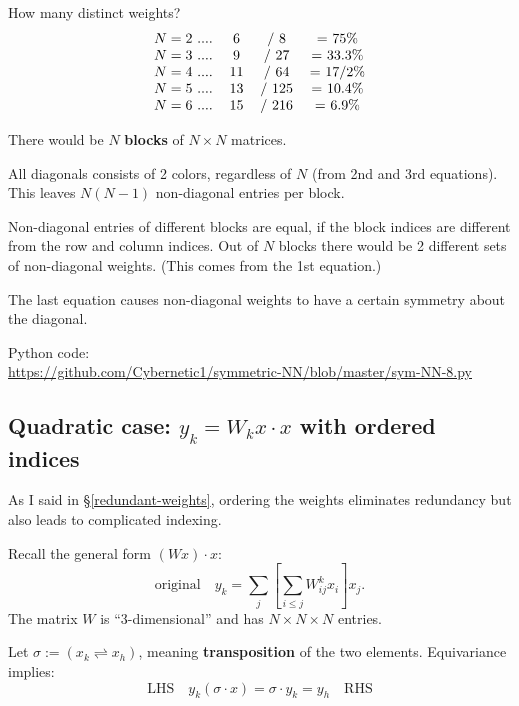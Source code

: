 How many distinct weights?
\begin{equation}
\begin{tabular}{c c c c}
$N = 2$ .... & 6 & / 8 & = 75\% \\
$N = 3$ .... & 9 & / 27 & = 33.3\% \\
$N = 4$ .... & 11 & / 64 & = 17/2\% \\
$N = 5$ .... & 13 & / 125 & = 10.4\% \\
$N = 6$ .... & 15 & / 216 & = 6.9\%
\end{tabular}
\end{equation}

There would be $N$ \textbf{blocks} of $N \times N$ matrices.

All diagonals consists of 2 colors, regardless of $N$ (from 2nd and 3rd equations).  This leaves $N (N - 1)$ non-diagonal entries per block.

Non-diagonal entries of different blocks are equal, if the block indices are different from the row and column indices.  Out of $N$ blocks there would be 2 different sets of non-diagonal weights.  (This comes from the 1st equation.)

The last equation causes non-diagonal weights to have a certain symmetry about the diagonal.  

Python code: \\
\href{https://github.com/Cybernetic1/symmetric-NN/blob/master/sym-NN-8.py}{https://github.com/Cybernetic1/symmetric-NN/blob/master/sym-NN-8.py}

\subsection{Quadratic case: $y_k = W_k x \cdot x$ with ordered indices}

As I said in \S\ref{redundant-weights}, ordering the weights eliminates redundancy but also leads to complicated indexing.

Recall the general form $(W x) \cdot x$:
\begin{equation}
\boxed{\mbox{original}} \quad y_k = \sum_j \left[ \sum_{i \le j} W_{ij}^k x_i \right] x_j .
\end{equation}
The matrix $W$ is ``3-dimensional'' and has $N \times N \times N$ entries.

Let $\sigma := (x_k \rightleftharpoons x_h)$, meaning \textbf{transposition} of the two elements.  Equivariance implies:
\begin{equation}
\boxed{\mbox{LHS}} \quad y_k ( \sigma \cdot x) = \sigma \cdot y_k = y_h \quad \boxed{\mbox{RHS}}
\end{equation}

